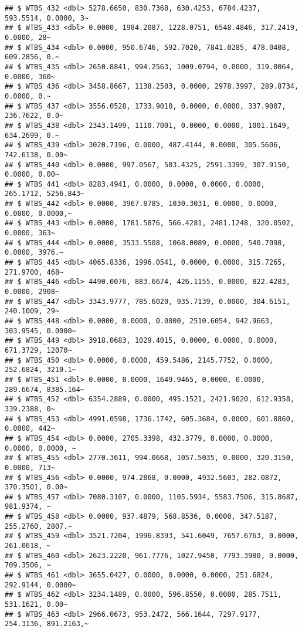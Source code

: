 \documentclass[
]{article}
\begin{document}
\begin{verbatim}
## $ WTBS_432 <dbl> 5278.6650, 830.7368, 630.4253, 6784.4237, 593.5514, 0.0000, 3~
## $ WTBS_433 <dbl> 0.0000, 1984.2087, 1228.0751, 6548.4846, 317.2419, 0.0000, 28~
## $ WTBS_434 <dbl> 0.0000, 950.6746, 592.7020, 7841.0285, 478.0408, 609.2856, 0.~
## $ WTBS_435 <dbl> 2650.8841, 994.2563, 1009.0794, 0.0000, 319.0064, 0.0000, 360~
## $ WTBS_436 <dbl> 3458.8667, 1138.2503, 0.0000, 2978.3997, 289.8734, 0.0000, 0.~
## $ WTBS_437 <dbl> 3556.0528, 1733.9010, 0.0000, 0.0000, 337.9007, 236.7622, 0.0~
## $ WTBS_438 <dbl> 2343.1499, 1110.7001, 0.0000, 0.0000, 1001.1649, 634.2699, 0.~
## $ WTBS_439 <dbl> 3020.7196, 0.0000, 487.4144, 0.0000, 305.5606, 742.6138, 0.00~
## $ WTBS_440 <dbl> 0.0000, 997.0567, 503.4325, 2591.3399, 307.9150, 0.0000, 0.00~
## $ WTBS_441 <dbl> 8283.4941, 0.0000, 0.0000, 0.0000, 0.0000, 265.1712, 5256.843~
## $ WTBS_442 <dbl> 0.0000, 3967.8785, 1030.3031, 0.0000, 0.0000, 0.0000, 0.0000,~
## $ WTBS_443 <dbl> 0.0000, 1781.5876, 566.4281, 2481.1248, 320.0502, 0.0000, 363~
## $ WTBS_444 <dbl> 0.0000, 3533.5508, 1068.0089, 0.0000, 540.7098, 0.0000, 3976.~
## $ WTBS_445 <dbl> 4065.8336, 1996.0541, 0.0000, 0.0000, 315.7265, 271.9700, 468~
## $ WTBS_446 <dbl> 4490.0076, 883.6674, 426.1155, 0.0000, 822.4283, 0.0000, 2908~
## $ WTBS_447 <dbl> 3343.9777, 785.6020, 935.7139, 0.0000, 304.6151, 240.1009, 29~
## $ WTBS_448 <dbl> 0.0000, 0.0000, 0.0000, 2510.6054, 942.9663, 303.9545, 0.0000~
## $ WTBS_449 <dbl> 3918.0683, 1029.4015, 0.0000, 0.0000, 0.0000, 671.3729, 12070~
## $ WTBS_450 <dbl> 0.0000, 0.0000, 459.5486, 2145.7752, 0.0000, 252.6824, 3210.1~
## $ WTBS_451 <dbl> 0.0000, 0.0000, 1649.9465, 0.0000, 0.0000, 289.6674, 8385.164~
## $ WTBS_452 <dbl> 6354.2889, 0.0000, 495.1521, 2421.9020, 612.9358, 339.2388, 0~
## $ WTBS_453 <dbl> 4991.0598, 1736.1742, 605.3684, 0.0000, 601.8860, 0.0000, 442~
## $ WTBS_454 <dbl> 0.0000, 2705.3398, 432.3779, 0.0000, 0.0000, 0.0000, 0.0000, ~
## $ WTBS_455 <dbl> 2770.3611, 994.0668, 1057.5035, 0.0000, 320.3150, 0.0000, 713~
## $ WTBS_456 <dbl> 0.0000, 974.2868, 0.0000, 4932.5603, 282.0872, 370.3501, 0.00~
## $ WTBS_457 <dbl> 7080.3107, 0.0000, 1105.5934, 5583.7506, 315.8687, 981.9374, ~
## $ WTBS_458 <dbl> 0.0000, 937.4879, 568.8536, 0.0000, 347.5187, 255.2760, 2807.~
## $ WTBS_459 <dbl> 3521.7204, 1996.8393, 541.6049, 7657.6763, 0.0000, 261.0618, ~
## $ WTBS_460 <dbl> 2623.2220, 961.7776, 1027.9450, 7793.3980, 0.0000, 709.3506, ~
## $ WTBS_461 <dbl> 3655.0427, 0.0000, 0.0000, 0.0000, 251.6824, 292.9144, 0.0000~
## $ WTBS_462 <dbl> 3234.1489, 0.0000, 596.8550, 0.0000, 285.7511, 531.1621, 0.00~
## $ WTBS_463 <dbl> 2966.0673, 953.2472, 566.1644, 7297.9177, 254.3136, 891.2163,~

\end{verbatim}
\end{document}
